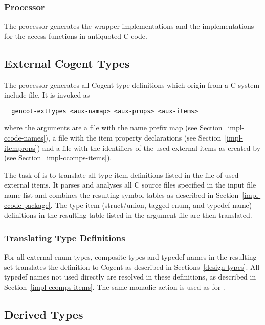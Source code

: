 \subsubsection{Processor }

The processor  generates the wrapper implementations and the implementations for 
the access functions in antiquoted C code.

\subsection{External Cogent Types}
\label{impl-ccomps-exttypes}

The processor  generates all Cogent type definitions which origin from a C system include file.
It is invoked as
\begin{verbatim}
  gencot-exttypes <aux-namap> <aux-props> <aux-items>
\end{verbatim}
where the arguments are a file  with the name prefix map 
(see Section~\ref{impl-ccode-names}), a file  with the item property declarations (see 
Section~\ref{impl-itemprops}) and a file  with the identifiers of the used external items as created 
by  (see Section~\ref{impl-ccomps-items}).

The task of  is to translate all type item definitions listed in the 
file of used external items. It parses and analyses
all C source files specified in the input file name list and combines the resulting symbol tables as
described in Section~\ref{impl-ccode-package}. The type item (struct/union, tagged enum, and typedef name) definitions 
in the resulting table listed in the argument file are then translated.

\subsubsection{Translating Type Definitions}

For all external enum types, composite types and typedef names in the resulting set  translates the
definition to Cogent as described in Sections~\ref{design-types}.
All typedef names not used directly are resolved in these definitions, as described in Section~\ref{impl-ccomps-items}.
The same monadic action  is used as for .

\subsection{Derived Types}
\label{impl-ccomps-dvdtypes}

